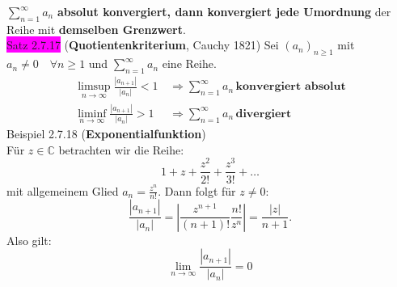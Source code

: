 \documentclass[landscape, 10pt]{article}
\newcommand{\C}{\mathbb{C}}
\begin{document}
\begin{multicols}{3}
                     \textcolor{NavyBlue}{$\sum_{n=1}^\infty a_n$} \textbf{absolut 
                     konvergiert, dann konvergiert jede Umordnung} der Reihe 
                     mit \textbf{demselben Grenzwert}.\\
              \colorbox{magenta}{Satz 2.7.17} 
              (\textbf{Quotientenkriterium}, Cauchy 1821) 
                     Sei \textcolor{NavyBlue}{
                     $(a_n)_{n\geqslant1}$} mit 
                     \textcolor{NavyBlue}{
                     $a_n\neq0\quad\forall n\geqslant1$}
                     und \textcolor{NavyBlue}{
                     $\sum_{n=1}^\infty a_n$} eine Reihe.
                     \begin{align*}
                            \limsup\limits_{n\to\infty}
                            \frac{|a_{n+1}|}{|a_n|}<1 \,
                            &\Longrightarrow
                            \sum_{n=1}^\infty a_n \,
                            \textbf{konvergiert absolut} \\
                            \liminf\limits_{n\to\infty}
                            \frac{|a_{n+1}|}{|a_n|}>1 \,
                            &\Longrightarrow
                            \sum_{n=1}^\infty a_n \,
                            \textbf{divergiert}
                     \end{align*}
              \colorbox{Dandelion}{Beispiel 2.7.18} 
              (\textbf{Exponentialfunktion})\\
                     Für \textcolor{NavyBlue}{$z\in\C$}
                     betrachten wir die Reihe:
                     \begin{equation*}
                            1+z+\frac{z^2}{2!}+\frac{z^3}{3!}+\dots
                     \end{equation*}
                     mit allgemeinem Glied
                     \textcolor{NavyBlue}{$a_n=\frac{z^n}{n!}$}.
                     Dann folgt für \textcolor{NavyBlue}{$z\neq0$}:
                     \begin{equation*}
                            \frac{|a_{n+1}|}{|a_n|}
                            =|\frac{z^{n+1}}{(n+1)!}\frac{n!}{z^n}|
                            =\frac{|z|}{n+1}.
                     \end{equation*}
                     Also gilt:
                     \begin{equation*}
                            \lim\limits_{n\to\infty}\frac{|a_{n+1}|}{|a_n|}=0
                     \end{equation*}

\end{multicols}
\end{document}
